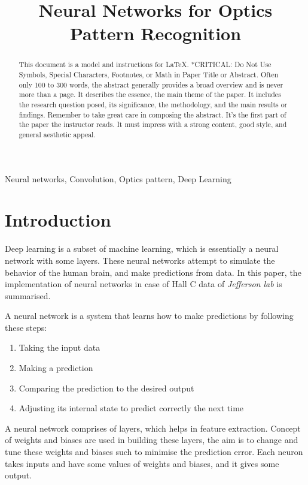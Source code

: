 \documentclass[conference]{IEEEtran}
\begin{document}

\title{Neural Networks for Optics Pattern Recognition
}

\author{
} 

\maketitle

\begin{abstract}
This document is a model and instructions for \LaTeX.
*CRITICAL: Do Not Use Symbols, Special Characters, Footnotes, or Math in Paper Title or Abstract.
Often only 100 to 300 words, the abstract generally provides a broad overview and is never more than a page.
It describes the essence, the main theme of the paper. It includes the research question posed, its significance,
the methodology, and the main results or findings. Remember to take great care in composing the abstract. It's the
first part of the paper the instructor reads. It must impress with a strong content, good style, and general aesthetic appeal.
\end{abstract}

\begin{IEEEkeywords}
Neural networks, Convolution, Optics pattern, Deep Learning
\end{IEEEkeywords}

\section{\textbf{Introduction}}


Deep learning is a subset of machine learning, which is essentially a neural network with some layers. These neural networks attempt to simulate the behavior of the human brain, and make predictions from data.
In this paper, the implementation of neural networks in case of Hall C data of \emph{Jefferson lab} is summarised.

A neural network is a system that learns how to make predictions by following these steps:
\begin{enumerate}
    \item Taking the input data
    \item Making a prediction
    \item Comparing the prediction to the desired output
    \item Adjusting its internal state to predict correctly the next time
\end{enumerate}
A neural network comprises of layers, which helps in feature extraction. Concept of weights and biases are used in building these layers, the aim is to change and tune these weights and biases such to minimise the prediction error.
Each neuron takes inputs and have some values of weights and biases, and it gives some output.
\end{document}

